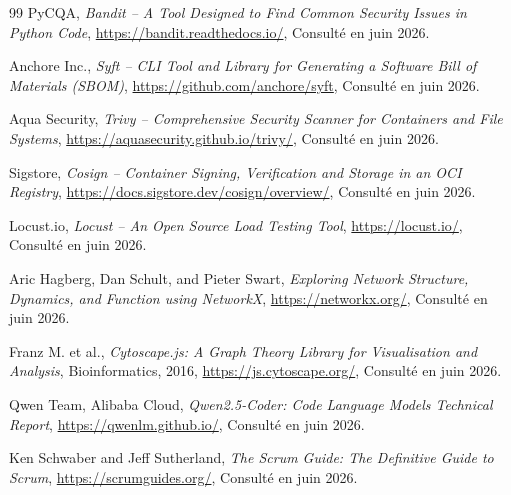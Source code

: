 \begin{thebibliography}{99}
     PyCQA, \textit{Bandit -- A Tool Designed to Find Common Security Issues in Python Code}, \url{https://bandit.readthedocs.io/}, Consult\'e en juin 2026.

     Anchore Inc., \textit{Syft -- CLI Tool and Library for Generating a Software Bill of Materials (SBOM)}, \url{https://github.com/anchore/syft}, Consult\'e en juin 2026.

     Aqua Security, \textit{Trivy -- Comprehensive Security Scanner for Containers and File Systems}, \url{https://aquasecurity.github.io/trivy/}, Consult\'e en juin 2026.

     Sigstore, \textit{Cosign -- Container Signing, Verification and Storage in an OCI Registry}, \url{https://docs.sigstore.dev/cosign/overview/}, Consult\'e en juin 2026.

     Locust.io, \textit{Locust -- An Open Source Load Testing Tool}, \url{https://locust.io/}, Consult\'e en juin 2026.

     Aric Hagberg, Dan Schult, and Pieter Swart, \textit{Exploring Network Structure, Dynamics, and Function using NetworkX}, \url{https://networkx.org/}, Consult\'e en juin 2026.

     Franz M. et al., \textit{Cytoscape.js: A Graph Theory Library for Visualisation and Analysis}, Bioinformatics, 2016, \url{https://js.cytoscape.org/}, Consult\'e en juin 2026.

     Qwen Team, Alibaba Cloud, \textit{Qwen2.5-Coder: Code Language Models Technical Report}, \url{https://qwenlm.github.io/}, Consult\'e en juin 2026.

     Ken Schwaber and Jeff Sutherland, \textit{The Scrum Guide: The Definitive Guide to Scrum}, \url{https://scrumguides.org/}, Consult\'e en juin 2026.

\end{thebibliography}

